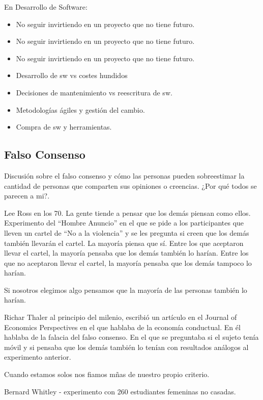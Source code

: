 \documentclass[12pt, a4paper, twoside]{article}
\begin{document}
\newpage
En Desarrollo de Software:
\begin{itemize}
    \item No seguir invirtiendo en un proyecto que no tiene futuro.
    \item No seguir invirtiendo en un proyecto que no tiene futuro.
    \item No seguir invirtiendo en un proyecto que no tiene futuro.
    \item Desarrollo de sw vs costes hundidos
    \item Decisiones de mantenimiento vs reescritura de sw.
    \item Metodologías ágiles y gestión del cambio.
    \item Compra de sw y herramientas.
\end{itemize}


\subsection{Falso Consenso}

Discusión sobre el falso consenso y cómo las personas pueden sobreestimar la cantidad de personas que comparten sus opiniones o creencias.
¿Por qué todos se parecen a mi?.

Lee Ross en los 70. La gente tiende a pensar que los demás piensan como ellos.
Experimento del ``Hombre Anuncio'' en el que se pide a los participantes que lleven un cartel de ``No a la violencia'' y se les pregunta si creen que los demás también llevarán el cartel. La mayoría piensa que sí.
Entre los que aceptaron llevar el cartel, la mayoría pensaba que los demás también lo harían.
Entre los que no aceptaron llevar el cartel, la mayoría pensaba que los demás tampoco lo harían.

Si nosotros elegimos algo pensamos que la mayoría de las personas también lo harían.

Richar Thaler al principio del milenio, escribió un artículo en el Journal of Economics Perspectives en el que hablaba de la economía conductual. En él hablaba de la falacia del falso consenso.
En el que se preguntaba si el sujeto tenía móvil y si pensaba que los demás también lo tenían con resultados análogos al experimento anterior.  

Cuando estamos solos nos fiamos mñas de nuestro propio criterio.

Bernard Whitley - experimento con 260 estudiantes femeninas no casadas.
\end{document}
